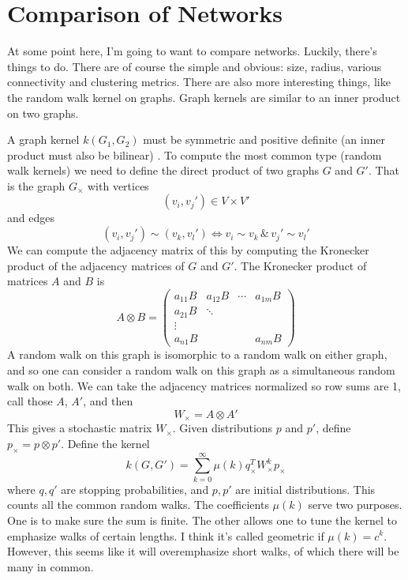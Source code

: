 \documentclass[10pt]{article}
\theoremstyle{definition}
\numberwithin{theorem}{section}
\numberwithin{definition}{section}
\numberwithin{lemma}{section}
\numberwithin{corollary}{section}
\numberwithin{clm}{section}
\numberwithin{rmk}{section}
\begin{document}
	
\section{Comparison of Networks}
At some point here, I'm going to want to compare networks. Luckily, there's things to do. There are of course the simple and obvious: size, radius, various connectivity and clustering metrics. There are also more interesting things, like the random walk kernel on graphs. Graph kernels are similar to an inner product on two graphs.

A graph kernel $k(G_1,G_2)$ must be symmetric and positive definite (an inner product must also be bilinear) \cite{Vishwanathan}. To compute the most common type (random walk kernels) we need to define the direct product of two graphs $G$ and $G'$. That is the graph $G_{\times}$ with vertices 
\[
(v_i,v_j') \in V \times V'
\]
and edges
\[
(v_i,v_j') \sim (v_k,v_l') \Leftrightarrow v_i \sim v_k \, \&\, v_j' \sim v_l'
\]
We can compute the adjacency matrix of this by computing the Kronecker product of the adjacency matrices of $G$ and $G'$. The Kronecker product of matrices $A$ and $B$ is
\[
A \otimes B = \begin{pmatrix}
a_{11} B & a_{12}B & \cdots & a_{1m}B\\
a_{21}B & \ddots & &\\
\vdots & & & \\
a_{n1}B & & & a_{nm}B
\end{pmatrix}
\]
A random walk on this graph is isomorphic to a random walk on either graph, and so one can consider a random walk on this graph as a simultaneous random walk on both. We can take the adjacency matrices normalized so row sums are 1, call those $A$, $A'$, and then
\[
W_{\times}  = A \otimes A'
\] 
This gives a stochastic matrix $W_{\times}$. Given distributions $p$ and $p'$, define $p_{\times}  = p \otimes p'$. Define the kernel
\[
k(G,G') = \sum_{k=0}^{\infty} \mu(k) q_{\times}^T W_{\times}^k p_{\times}
\]
where $q,q'$ are stopping probabilities, and $p,p'$ are initial distributions. This counts all the common random walks. The coefficients $\mu(k)$ serve two purposes. One is to make sure the sum is finite. The other allows one to tune the kernel to emphasize walks of certain lengths. I think it's called geometric if $\mu(k) = c^k$. However, this seems like it will overemphasize short walks, of which there will be many in common.

	


\end{document}
